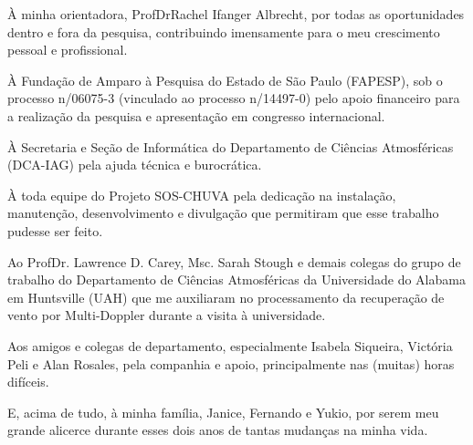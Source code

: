 \begin{agradecimentos}
À minha orientadora, Prof\textordfeminine\:Dr\textordfeminine\:Rachel Ifanger Albrecht, por todas as oportunidades dentro e fora da pesquisa, contribuindo imensamente para o meu crescimento pessoal e profissional.

À Fundação de Amparo à Pesquisa do Estado de São Paulo (FAPESP), sob o processo n\textordmasculine{}/06075-3 (vinculado ao processo n\textordmasculine{}/14497-0) pelo apoio financeiro para a realização da pesquisa e apresentação em congresso internacional.

À Secretaria e Seção de Informática do Departamento de Ciências Atmosféricas (DCA-IAG) pela ajuda técnica e burocrática.

À toda equipe do Projeto SOS-CHUVA pela dedicação na instalação, manutenção, desenvolvimento e divulgação que permitiram que esse trabalho pudesse ser feito.

Ao Prof\textordmasculine\:Dr. Lawrence D. Carey, Msc. Sarah Stough e demais colegas do grupo de trabalho do Departamento de Ciências Atmosféricas da Universidade do Alabama em Huntsville (UAH) que me auxiliaram no processamento da recuperação de vento por Multi-Doppler durante a visita à universidade.

Aos amigos e colegas de departamento, especialmente Isabela Siqueira, Victória Peli e Alan Rosales, pela companhia e apoio, principalmente nas (muitas) horas difíceis.

E, acima de tudo, à minha família, Janice, Fernando e Yukio, por serem meu grande alicerce durante esses dois anos de tantas mudanças na minha vida.
\end{agradecimentos}


